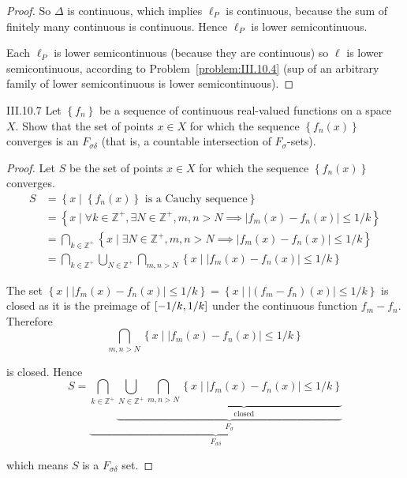 \begin{proof}
	So \( \Delta \) is continuous, which implies \( \ell_{P} \) is continuous, because the sum of finitely many continuous is continuous. Hence \( \ell_{P} \) is lower semicontinuous.

	Each \( \ell_{P} \) is lower semicontinuous (because they are continuous) so \( \ell \) is lower semicontinuous, according to Problem~\ref{problem:III.10.4} (sup of an arbitrary family of lower semicontinuous is lower semicontinuous).
\end{proof}

\begin{problem}{III.10.7}
Let \( \left\{ f_{n} \right\} \) be a sequence of continuous real-valued functions on a space \(X\). Show that the set of points \( x \in X \) for which the sequence \( \left\{ f_{n}(x) \right\} \) converges is an \( F_{\sigma\delta} \) (that is, a countable intersection of \( F_{\sigma} \)-sets).
\end{problem}

\begin{proof}
	Let \( S \) be the set of points \( x \in X \) for which the sequence \( \left\{ f_{n}(x) \right\} \) converges.
	\begingroup
	\allowdisplaybreaks%
	\begin{align*}
		S & = \left\{ x \mid \left\{ f_{n}(x) \right\}\text{ is a Cauchy sequence} \right\}                                                                               \\
		  & = \left\{ x \mid \forall k \in \mathbb{Z}^{+}, \exists N \in \mathbb{Z}^{+}, m, n > N \implies \left\vert f_{m}(x) - f_{n}(x) \right\vert \le 1/k \right\}    \\
		  & = \bigcap_{k \in \mathbb{Z}^{+}} \left\{ x \mid \exists N \in \mathbb{Z}^{+}, m, n > N \implies \left\vert f_{m}(x) - f_{n}(x) \right\vert \le 1/k \right\}   \\
		  & = \bigcap_{k \in \mathbb{Z}^{+}} \bigcup_{N \in \mathbb{Z}^{+}} \bigcap_{m, n > N} \left\{ x \mid \left\vert f_{m}(x) - f_{n}(x) \right\vert \le 1/k \right\}
	\end{align*}
	\endgroup

	The set \( \left\{ x \mid \left\vert f_{m}(x) - f_{n}(x) \right\vert \le 1/k \right\} = \left\{ x \mid \left\vert (f_{m} - f_{n})(x) \right\vert \le 1/k \right\} \) is closed as it is the preimage of \( \left\lbrack{-1/k, 1/k}\right\rbrack \) under the continuous function \( f_{m} - f_{n} \). Therefore
	\[
		\bigcap_{m, n > N} \left\{ x \mid \left\vert f_{m}(x) - f_{n}(x) \right\vert \le 1/k \right\}
	\]

	is closed. Hence
	\[
		S = \underbrace{\bigcap_{k \in \mathbb{Z}^{+}} \underbrace{\bigcup_{N \in \mathbb{Z}^{+}} \underbrace{\bigcap_{m, n > N} \left\{ x \mid \left\vert f_{m}(x) - f_{n}(x) \right\vert \le 1/k \right\}}_{\text{closed}}}_{F_{\sigma}}}_{F_{\sigma\delta}}
	\]

	which means \( S \) is a \( F_{\sigma\delta} \) set.
\end{proof}

